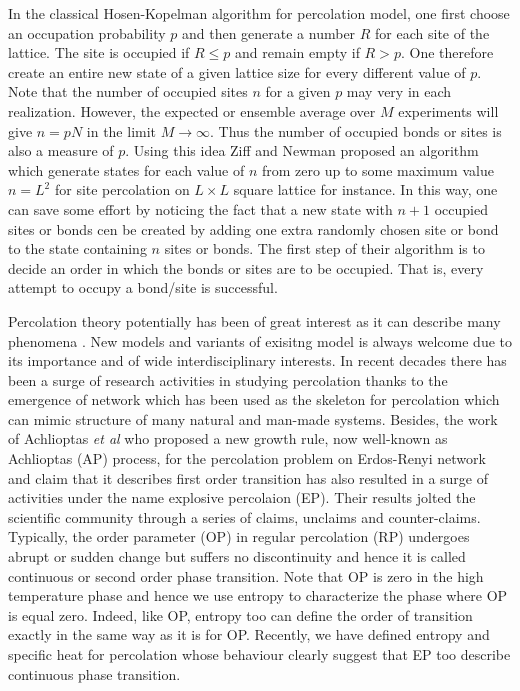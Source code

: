 ﻿\documentclass[twocolumn,showpacs,preprintnumbers,amsmath,amssymb]{revtex4}
\begin{document}
In the classical Hosen-Kopelman algorithm for percolation model, one first choose an occupation probability 
$p$ and then generate
a number $R$ for each site of the lattice. The site is occupied if $R\leq p$ and remain empty if $R>p$.
One therefore create an entire new state of a given lattice size for every different value of $p$. Note that
 the number of occupied sites $n$ for a given $p$ may very in each realization. However, the expected or ensemble 
average over $M$ experiments will give $n=pN$ in the limit $M\rightarrow \infty$. Thus the number
of occupied bonds or sites is also a measure of $p$. Using this idea Ziff and Newman proposed an algorithm which generate states for each
value of $n$ from zero up to some maximum value $n=L^2$ for site percolation on $L\times L$ square lattice for
instance. In this way, one can save some effort by noticing 
the fact that a new state with $n+1$ occupied sites or bonds cen be created by adding one extra randomly chosen site or bond
to the state containing $n$ sites or bonds. The first step of their algorithm is to decide an order in which the bonds or
sites are to be occupied. That is, every attempt to occupy a bond/site is successful.

Percolation theory potentially has been of great interest as it can describe
many phenomena \cite{ref.Sahimi}. New models and variants of exisitng model is always
welcome due to its importance and of wide interdisciplinary interests. In recent decades there has been
a surge of research activities in studying percolation thanks to the emergence of network which has
been used as the skeleton for percolation which can mimic structure of many natural and man-made systems. 
Besides, the work of Achlioptas {\it et al} who proposed a new growth rule, now well-known as Achlioptas  (AP) process, 
for the percolation problem on Erdos-Renyi network and claim that it describes first order transition has
also resulted in a surge of activities under the name explosive percolaion (EP). 
Their results jolted the scientific community through a series of claims, unclaims and counter-claims.
Typically,  the order parameter (OP) in regular percolation (RP) undergoes abrupt or sudden change but 
suffers no discontinuity and hence it is called continuous or second order phase transition. 
Note that OP is zero in the high temperature phase and hence we use entropy to characterize
the phase where OP is equal zero. Indeed, like OP, entropy too can define the order of transition exactly
in the same way as it is for OP. Recently, we have defined entropy and specific heat for percolation whose
behaviour clearly suggest that EP too describe continuous phase transition.
\end{document}
